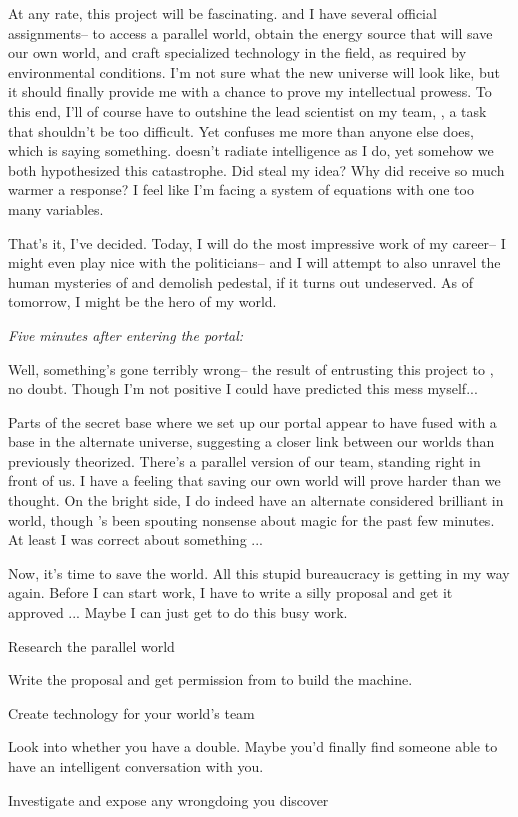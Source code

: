 \documentclass[char]{guildcamp3}
\begin{document}
At any rate, this project will be fascinating. \cSciOne{} and I have several official assignments-- to access a parallel world, obtain the energy source that will save our own world, and craft specialized technology in the field, as required by environmental conditions. I'm not sure what the new universe will look like, but it should finally provide me with a chance to prove my intellectual prowess. To this end, I'll of course have to outshine the lead scientist on my team, \cSciOne{}, a task that shouldn't be too difficult. Yet \cSciOne{\they} confuses me more than anyone else does, which is saying something. \cSciOne{\they} doesn't radiate intelligence as I do, yet somehow we both hypothesized this catastrophe. Did \cSciOne{\they} steal my idea? Why did \cSciOne{\they} receive so much warmer a response? I feel like I'm facing a system of equations with one too many variables.

That's it, I've decided. Today, I will do the most impressive work of my career-- I might even play nice with the politicians-- and I will attempt to also unravel the human mysteries of \cSciOne{} and demolish \cSciOne{\their} pedestal, if it turns out undeserved. As of tomorrow, I might be the hero of my world.

\emph{Five minutes after entering the portal:}


Well, something's gone terribly wrong-- the result of entrusting this project to \cSciOne{}, no doubt. Though I'm not positive I could have predicted this mess myself...

Parts of the secret base where we set up our portal appear to have fused with a base in the alternate universe, suggesting a closer link between our worlds than previously theorized. There's a parallel version of our team, standing right in front of us. I have a feeling that saving our own world will prove harder than we thought.
On the bright side, I do indeed have an alternate considered brilliant in \cMageOne{\their} world, though \cMageOne{\they}'s been spouting nonsense about magic for the past few minutes. At least I was correct about something ...

Now, it's time to save the world. All this stupid bureaucracy is getting in my way again. Before I can start work, I have to write a silly proposal and get it approved ... Maybe I can just get \cSciOne{} to do this busy work.

\begin{itemz}[Goals]
  \item Research the parallel world
  \item Write the proposal and get permission from \cPoliOne{} to build the machine. 
  \item Create technology for your world's team
  \item Look into whether you have a double. Maybe you'd finally find someone able to have an intelligent conversation with you. 
  \item Investigate \cSciOne{} and expose any wrongdoing you discover
\end{itemz}
\end{document}
